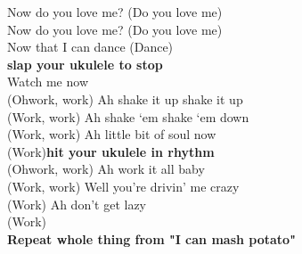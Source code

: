 Now do you love me? (Do you love me)\\
Now do you love me? (Do you love me)\\
Now that I can dance (Dance)\\
\textbf{slap your ukulele to stop}\\
Watch me now\\
(Ohwork, work) Ah shake it up shake it up\\
(Work, work) Ah shake ‘em shake ‘em down\\
(Work, work) Ah little bit of soul now\\
(Work)\textbf{hit your ukulele in rhythm}\\
(Ohwork, work) Ah work it all baby\\
(Work, work) Well you’re drivin’ me crazy\\
(Work) Ah don’t get lazy\\
(Work)\\
\textbf{Repeat whole thing from "I can mash potato"}\\
